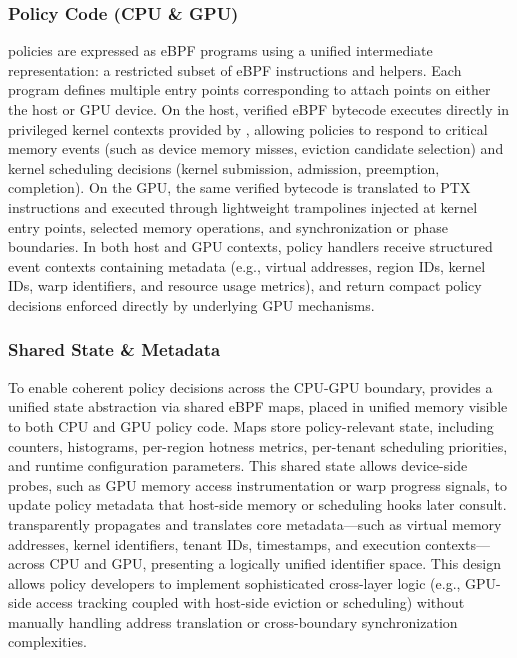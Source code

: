 \subsubsection{Policy Code (CPU \& GPU)}

\sys policies are expressed as eBPF programs using a unified intermediate representation: a restricted subset of eBPF instructions and helpers. Each program defines multiple entry points corresponding to attach points on either the host or GPU device. On the host, verified eBPF bytecode executes directly in privileged kernel contexts provided by \sysdriver, allowing policies to respond to critical memory events (such as device memory misses, eviction candidate selection) and kernel scheduling decisions (kernel submission, admission, preemption, completion). On the GPU, the same verified bytecode is translated to PTX instructions and executed through lightweight trampolines injected at kernel entry points, selected memory operations, and synchronization or phase boundaries. In both host and GPU contexts, policy handlers receive structured event contexts containing metadata (e.g., virtual addresses, region IDs, kernel IDs, warp identifiers, and resource usage metrics), and return compact policy decisions enforced directly by underlying GPU mechanisms.

\subsubsection{Shared State \& Metadata}

To enable coherent policy decisions across the CPU-GPU boundary, \sys provides a unified state abstraction via shared eBPF maps, placed in unified memory visible to both CPU and GPU policy code. Maps store policy-relevant state, including counters, histograms, per-region hotness metrics, per-tenant scheduling priorities, and runtime configuration parameters. This shared state allows device-side probes, such as GPU memory access instrumentation or warp progress signals, to update policy metadata that host-side memory or scheduling hooks later consult. \sys transparently propagates and translates core metadata—such as virtual memory addresses, kernel identifiers, tenant IDs, timestamps, and execution contexts—across CPU and GPU, presenting a logically unified identifier space. This design allows policy developers to implement sophisticated cross-layer logic (e.g., GPU-side access tracking coupled with host-side eviction or scheduling) without manually handling address translation or cross-boundary synchronization complexities.

